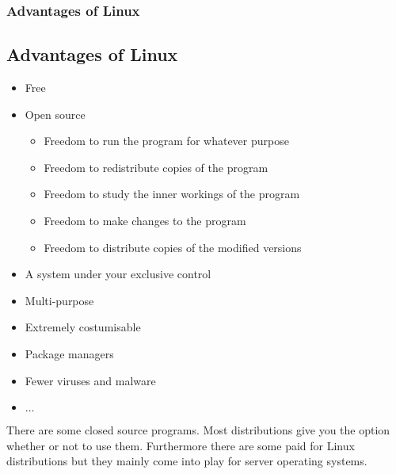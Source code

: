 \begin{frame}
	\frametitle{Advantages of Linux}
	\subsection{Advantages of Linux}
	
	\begin{itemize}
		\item Free
		\item Open source
			\begin{tiny}
				\begin{itemize}
					\item Freedom to run the program for whatever purpose
					\item Freedom to redistribute copies of the program
					\item Freedom to study the inner workings of the program
					\item Freedom to make changes to the program
					\item Freedom to distribute copies of the modified versions
				\end{itemize}
			\end{tiny}
		\item A system under your exclusive control
		\item Multi-purpose
		\item Extremely costumisable
		\item Package managers
		\item Fewer viruses and malware
		\item $\dots$
	\end{itemize}

	\vfill
	
	There are some closed source programs. Most distributions give you the option whether or not to use them. Furthermore there are some paid for Linux distributions but they mainly come into play for server operating systems.
\end{frame}
